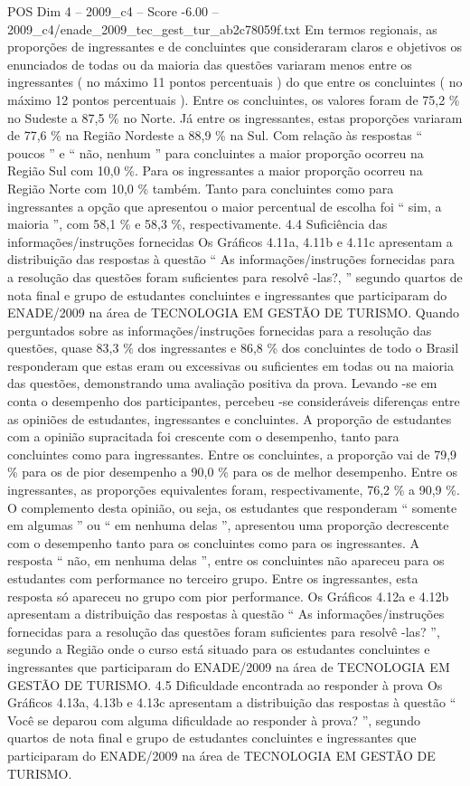 \begin{textsample}{POS Dim 4 – 2009\_c4 – Score -6.00 – 2009\_c4/enade\_2009\_tec\_gest\_tur\_ab2c78059f.txt}
Em termos regionais, as proporções de ingressantes e de concluintes que consideraram claros e objetivos os enunciados de todas ou da maioria das questões variaram menos entre os ingressantes ( no máximo 11 pontos percentuais ) do que entre os concluintes ( no máximo 12 pontos percentuais ).
Entre os concluintes, os valores foram de 75,2 \% no Sudeste a 87,5 \% no Norte.
Já entre os ingressantes, estas proporções variaram de 77,6 \% na Região Nordeste a 88,9 \% na Sul.
Com relação às respostas “ poucos ” e “ não, nenhum ” para concluintes a maior proporção ocorreu na Região Sul com 10,0 \%.
Para os ingressantes a maior proporção ocorreu na Região Norte com 10,0 \% também.
Tanto para concluintes como para ingressantes a opção que apresentou o maior percentual de escolha foi “ sim, a maioria ”, com 58,1 \% e 58,3 \%, respectivamente. 4.4 Suficiência das informações/instruções fornecidas Os Gráficos 4.11a, 4.11b e 4.11c apresentam a distribuição das respostas à questão “ As informações/instruções fornecidas para a resolução das questões foram suficientes para resolvê -las?, ” segundo quartos de nota final e grupo de estudantes concluintes e ingressantes que participaram do ENADE/2009 na área de TECNOLOGIA EM GESTÃO DE TURISMO.
Quando perguntados sobre as informações/instruções fornecidas para a resolução das questões, quase 83,3 \% dos ingressantes e 86,8 \% dos concluintes de todo o Brasil responderam que estas eram ou excessivas ou suficientes em todas ou na maioria das questões, demonstrando uma avaliação positiva da prova.
Levando -se em conta o desempenho dos participantes, percebeu -se consideráveis diferenças entre as opiniões de estudantes, ingressantes e concluintes.
A proporção de estudantes com a opinião supracitada foi crescente com o desempenho, tanto para concluintes como para ingressantes.
Entre os concluintes, a proporção vai de 79,9 \% para os de pior desempenho a 90,0 \% para os de melhor desempenho.
Entre os ingressantes, as proporções equivalentes foram, respectivamente, 76,2 \% a 90,9 \%.
O complemento desta opinião, ou seja, os estudantes que responderam “ somente em algumas ” ou “ em nenhuma delas ”, apresentou uma proporção decrescente com o desempenho tanto para os concluintes como para os ingressantes.
A resposta “ não, em nenhuma delas ”, entre os concluintes não apareceu para os estudantes com performance no terceiro grupo.
Entre os ingressantes, esta resposta só apareceu no grupo com pior performance.
Os Gráficos 4.12a e 4.12b apresentam a distribuição das respostas à questão “ As informações/instruções fornecidas para a resolução das questões foram suficientes para resolvê -las? ”, segundo a Região onde o curso está situado para os estudantes concluintes e ingressantes que participaram do ENADE/2009 na área de TECNOLOGIA EM GESTÃO DE TURISMO. 4.5 Dificuldade encontrada ao responder à prova Os Gráficos 4.13a, 4.13b e 4.13c apresentam a distribuição das respostas à questão “ Você se deparou com alguma dificuldade ao responder à prova? ”, segundo quartos de nota final e grupo de estudantes concluintes e ingressantes que participaram do ENADE/2009 na área de TECNOLOGIA EM GESTÃO DE TURISMO.

\end{textsample}
